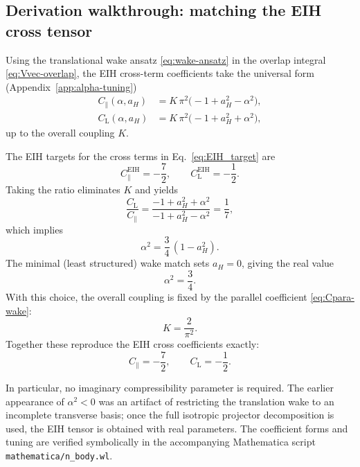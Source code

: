 \documentclass[11pt]{article}
\begin{document}
\subsection{Derivation walkthrough: matching the EIH cross tensor}
\label{subsec:nbody-derivation}

Using the translational wake ansatz \eqref{eq:wake-ansatz} in the overlap
integral \eqref{eq:Vvec-overlap}, the EIH cross-term coefficients take the
universal form (Appendix~\ref{app:alpha-tuning})
\begin{align}
  C_\parallel(\alpha,a_H) &= K\,\pi^2\bigl(-1 + a_H^2 - \alpha^2\bigr),
  \label{eq:Cpara-wake}
  \\
  C_{\text{L}}(\alpha,a_H) &= K\,\pi^2\bigl(-1 + a_H^2 + \alpha^2\bigr),
  \label{eq:CL-wake}
\end{align}
up to the overall coupling $K$.

The EIH targets for the cross terms in Eq.~\eqref{eq:EIH_target} are
\begin{equation}
  C_\parallel^{\text{EIH}}=-\frac{7}{2},
  \qquad
  C_{\text{L}}^{\text{EIH}}=-\frac{1}{2}.
\end{equation}
Taking the ratio eliminates $K$ and yields
\begin{equation}
  \frac{C_{\text{L}}}{C_\parallel}
  =
  \frac{-1 + a_H^2 + \alpha^2}{-1 + a_H^2 - \alpha^2}
  =
  \frac{1}{7},
\end{equation}
which implies
\begin{equation}
  \alpha^2=\frac{3}{4}\,(1-a_H^2).
\end{equation}
The minimal (least structured) wake match sets $a_H=0$, giving the real value
\begin{equation}
  \alpha^2=\frac{3}{4}.
  \label{eq:alpha-squared}
\end{equation}
With this choice, the overall coupling is fixed by the parallel coefficient
\eqref{eq:Cpara-wake}:
\begin{equation}
  K=\frac{2}{\pi^2}.
  \label{eq:K-wake}
\end{equation}
Together these reproduce the EIH cross coefficients exactly:
\begin{equation}
  C_\parallel=-\frac{7}{2},
  \qquad
  C_{\text{L}}=-\frac{1}{2}.
\end{equation}

In particular, no imaginary compressibility parameter is required.
The earlier appearance of $\alpha^2<0$ was an artifact of restricting the
translation wake to an incomplete transverse basis; once the full isotropic
projector decomposition is used, the EIH tensor is obtained with real
parameters.
The coefficient forms and tuning are verified symbolically in the accompanying
Mathematica script \texttt{mathematica/n\_body.wl}.
\end{document}
